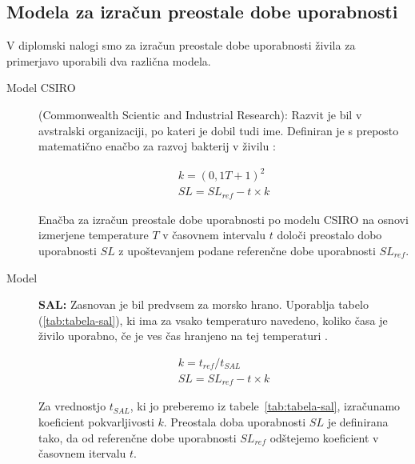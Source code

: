 \documentclass[a4paper, 12pt]{book}
\begin{document}
\clearpage

\subsection{Modela za izračun preostale dobe uporabnosti}
\label{modela-za-izracun-sl}

V diplomski nalogi smo za izračun preostale dobe uporabnosti živila za primerjavo uporabili dva različna modela.

\begin{description}

	\item[Model CSIRO] (Commonwealth Scientic and Industrial Research): Razvit je bil v avstralski organizaciji, po kateri je dobil tudi ime. Definiran je s preposto matematično enačbo za razvoj bakterij v živilu \cite{magistrska-marolt}:
	
	\begin{align}
		k = (0,1T + 1)^2				\nonumber \\
       	SL = SL_{ref} - t \times k		\nonumber
	\end{align}
	
	Enačba za izračun preostale dobe uporabnosti po modelu CSIRO na osnovi izmerjene temperature $T$ v časovnem intervalu $t$ določi preostalo dobo uporabnosti $SL$ z upoštevanjem podane referenčne dobe uporabnosti $SL_{ref}$.
	
	\item[Model]\textbf{SAL:} Zasnovan je bil predvsem za morsko hrano. Uporablja tabelo (\ref{tab:tabela-sal}), ki ima za vsako temperaturo navedeno, koliko časa je živilo uporabno, če je ves čas hranjeno na tej temperaturi \cite{magistrska-marolt}. 
	
	\begin{align}
		k = t_{ref} / t_{SAL}				\nonumber \\
       	SL = SL_{ref} - t \times k		\nonumber
	\end{align}
	
	Za vrednostjo $t_{SAL}$, ki jo preberemo iz tabele~\ref{tab:tabela-sal}, izračunamo koeficient pokvarljivosti $k$. Preostala doba uporabnosti $SL$ je definirana tako, da od referenčne dobe uporabnosti $SL_{ref}$ odštejemo koeficient v časovnem itervalu $t$.



\end{description}
\end{document}
